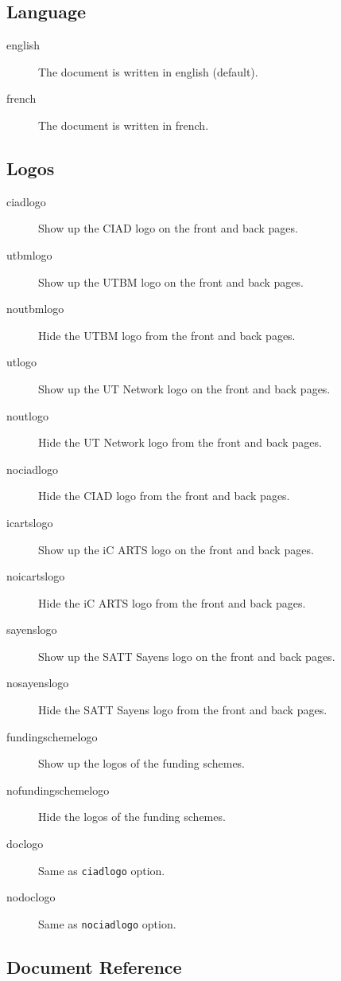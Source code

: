 \documentclass[article,nodocrefonfront,nodocrefonback]{utbmciadreport}
\begin{document}
\subsection{Language}

\begin{description}
\item[english] The document is written in english (default).
\item[french] The document is written in french.
\end{description}

\subsection{Logos}

\begin{description}
\item[ciadlogo] Show up the CIAD logo on the front and back pages.
\item[utbmlogo] Show up the UTBM logo on the front and back pages.
\item[noutbmlogo] Hide the UTBM logo from the front and back pages.
\item[utlogo] Show up the UT Network logo on the front and back pages.
\item[noutlogo] Hide the UT Network logo from the front and back pages.
\item[nociadlogo] Hide the CIAD logo from the front and back pages.
\item[icartslogo] Show up the iC ARTS logo on the front and back pages.
\item[noicartslogo] Hide the iC ARTS logo from the front and back pages.
\item[sayenslogo] Show up the SATT Sayens logo on the front and back pages.
\item[nosayenslogo] Hide the SATT Sayens logo from the front and back pages.
\item[fundingschemelogo] Show up the logos of the funding schemes.
\item[nofundingschemelogo] Hide the logos of the funding schemes.
\item[doclogo] Same as \texttt{ciadlogo} option.
\item[nodoclogo] Same as \texttt{nociadlogo} option.
\end{description}

\subsection{Document Reference}
\end{document}
